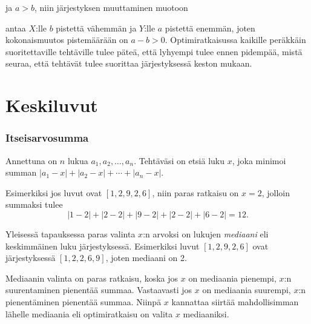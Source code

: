 ja $a>b$, niin järjestyksen muuttaminen muotoon

\begin{center}
\end{center}

antaa $X$:lle $b$ pistettä vähemmän ja $Y$:lle $a$ pistettä enemmän,
joten kokonaismuutos pistemäärään on $a-b > 0$.
Optimiratkaisussa
kaikille peräkkäin suoritettaville tehtäville
tulee päteä, että lyhyempi tulee ennen pidempää,
mistä seuraa, että tehtävät tulee suorittaa
järjestyksessä keston mukaan.

\section{Keskiluvut}

\subsubsection{Itseisarvosumma}

\begin{task}
Annettuna on $n$ lukua $a_1,a_2,\ldots,a_n$.
Tehtäväsi on etsiä luku $x$, joka minimoi summan
$|a_1-x|+|a_2-x|+\cdots+|a_n-x|.$
\end{task}

Esimerkiksi jos luvut ovat $[1,2,9,2,6]$,
niin paras ratkaisu on $x=2$,
jolloin summaksi tulee
\[
|1-2|+|2-2|+|9-2|+|2-2|+|6-2|=12.
\]

Yleisessä tapauksessa paras valinta $x$:n arvoksi
on lukujen \textit{mediaani}
eli keskimmäinen luku järjestyksessä.
Esimerkiksi luvut $[1,2,9,2,6]$
ovat järjestyksessä $[1,2,2,6,9]$,
joten mediaani on 2.

Mediaanin valinta on paras ratkaisu,
koska jos $x$ on mediaania pienempi,
$x$:n suurentaminen pienentää summaa.
Vastaavasti jos $x$ on mediaania suurempi,
$x$:n pienentäminen pienentää summaa.
Niinpä $x$ kannattaa siirtää mahdollisimman
lähelle mediaania eli optimiratkaisu on
valita $x$ mediaaniksi.


